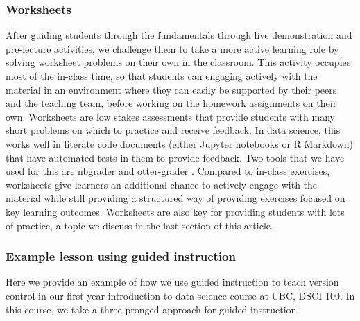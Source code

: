\documentclass[
  12 pt,
]{paper}
\begin{document}
\hypertarget{worksheets}{%
\subsubsection{Worksheets}\label{worksheets}}

After guiding students through the fundamentals
through live demonstration and pre-lecture activities,
we challenge them to take a more active learning role
by solving worksheet problems on their own in the classroom.
This activity occupies most of the in-class time,
so that students can engaging actively with the material
in an environment where they can easily be supported
by their peers and the teaching team,
before working on the homework assignments on their own.
Worksheets are low stakes assessments that
provide students with many short problems on which to practice and receive feedback.
In data science,
this works well in literate code documents
(either Jupyter notebooks or R Markdown)
that have automated tests in them to provide feedback.
Two tools that we have used for this are nbgrader \autocite{blank2019nbgrader}
and otter-grader \autocite{otter}.
Compared to in-class exercises,
worksheets give learners an additional chance to actively engage with the material
while still providing a structured way of providing exercises
focused on key learning outcomes.
Worksheets are also key for providing students with lots of practice,
a topic we discuss in the last section of this article.

\hypertarget{example-lesson-using-guided-instruction}{%
\subsubsection{Example lesson using guided instruction}\label{example-lesson-using-guided-instruction}}

Here we provide an example of how we use guided instruction to teach version
control in our first year introduction to data science course at UBC, DSCI 100.
In this course, we take a three-pronged approach for guided instruction.
\end{document}
